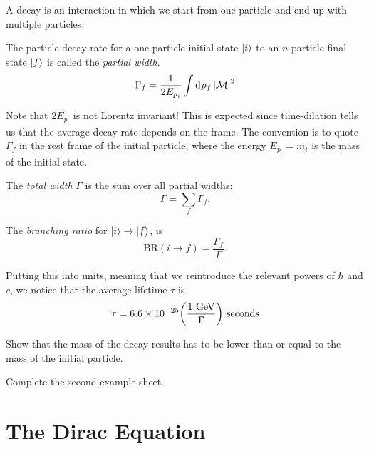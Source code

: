 A decay is an interaction in which we start from one particle and end up with multiple particles.
\begin{definition}[]
  The particle decay rate for a one-particle initial state $\ket{i}$ to an $n$-particle final state $\ket{f}$ is called the \emph{partial width}.
  \begin{equation}
    \Gamma_f = \frac{1}{2 E_{p_i}} \int \dd[]{p_f} \abs{\mathcal{M}}^2
  \end{equation}
\end{definition}
Note that $2 E_{p_i}$ is not Lorentz invariant! This is expected since time-dilation tells us that the average decay rate depends on the frame. 
The convention is to quote $\Gamma_f$ in the rest frame of the initial particle, where the energy $E_{p_i} = m_i$ is the mass of the initial state.
\begin{definition}[]
  The \emph{total width} $\Gamma$ is the sum over all partial widths:
  \begin{equation}
    \Gamma = \sum_f \Gamma_f.
  \end{equation}
\end{definition}

\begin{definition}[]
  The \emph{branching ratio} for $\ket{i} \to \ket{f}$, is 
  \begin{equation}
    \text{BR}(i \to f) = \frac{\Gamma_f}{\Gamma}.
  \end{equation}
\end{definition}
Putting this into units, meaning that we reintroduce the relevant powers of $\hbar$ and $c$, we notice that the average lifetime $\tau$ is
\begin{equation}
  \tau = 6.6 \times 10^{-25} \qty(\frac{1 \text{ GeV}}{\Gamma}) \text{ seconds}
\end{equation}

\begin{exercise}
  Show that the mass of the decay results has to be lower than or equal to the mass of the initial particle.
\end{exercise}
\begin{exercise}
  Complete the second example sheet.
\end{exercise}

\chapter{The Dirac Equation}%
\label{cha:the_dirac_equation}

